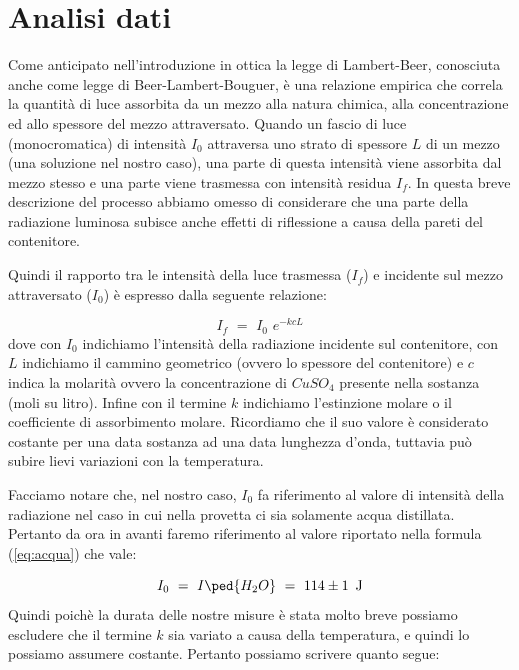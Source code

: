 \section{Analisi dati}

Come anticipato nell'introduzione in ottica la legge di Lambert-Beer, conosciuta anche come legge di Beer-Lambert-Bouguer, è una relazione empirica che correla la quantità di luce assorbita da un mezzo alla natura chimica, alla concentrazione ed allo spessore del mezzo attraversato.
Quando un fascio di luce (monocromatica) di intensità $I_0$ attraversa uno strato di spessore $L$ di un mezzo (una soluzione nel nostro caso), una parte di questa intensità viene assorbita dal mezzo stesso e una parte viene trasmessa con intensità residua $I_f$.
In questa breve descrizione del processo abbiamo omesso di considerare che una parte della radiazione luminosa subisce anche effetti di riflessione a causa della pareti del contenitore.

Quindi il rapporto tra le intensità della luce trasmessa ($I_f$) e incidente sul mezzo attraversato ($I_0$) è espresso dalla seguente relazione:

\begin{equation}
	I_f \,\,=\,\, I_0 \,\, e^{-kcL}
	\label{eq:intensita}
\end{equation}
%
dove con $I_0$ indichiamo l'intensità della radiazione incidente sul contenitore, con $L$ indichiamo il cammino geometrico (ovvero lo spessore del contenitore) e $c$ indica la molarità ovvero la concentrazione di $CuSO_4$ presente nella sostanza (moli su litro). Infine con il termine $k$ indichiamo l'estinzione molare o il coefficiente di assorbimento molare. Ricordiamo che il suo valore è considerato costante per una data sostanza ad una data lunghezza d'onda, tuttavia può subire lievi variazioni con la temperatura.

Facciamo notare che, nel nostro caso, $I_0$ fa riferimento al valore di intensità della radiazione nel caso in cui nella provetta ci sia solamente acqua distillata. Pertanto da ora in avanti faremo riferimento al valore riportato nella formula (\ref{eq:acqua}) che vale:

\begin{equation}
	I_0 \,\,=\,\, I\ped{H_2O} \,\,=\,\, 114 \pm 1 \,\,\, \si{\joule}
\end{equation}
%
Quindi poichè la durata delle nostre misure è stata molto breve possiamo escludere che il termine $k$ sia variato a causa della temperatura, e quindi lo possiamo assumere costante.
Pertanto possiamo scrivere quanto segue:

